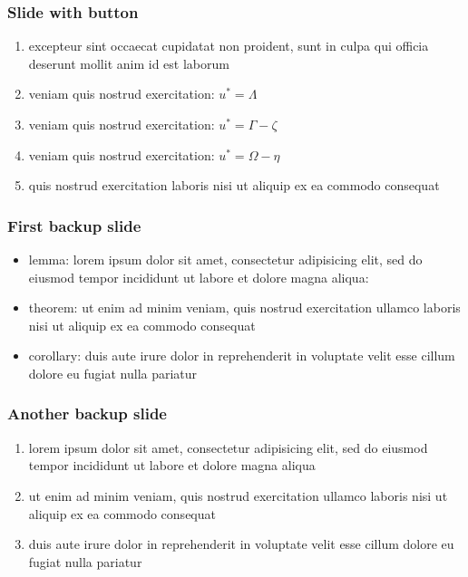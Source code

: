\documentclass[12pt,xcolor={dvipsnames},hyperref={pdftex,pdfpagemode=UseNone,hidelinks,pdfdisplaydoctitle=true},usepdftitle=false]{beamer}
\begin{document}
\begin{frame}[label=firstSlide]
\frametitle{Slide with button}
\begin{enumerate}
\item excepteur sint occaecat cupidatat non proident, sunt in culpa qui officia deserunt mollit anim id est laborum
\item veniam quis nostrud exercitation: $u^* = \Lambda$
\item veniam quis nostrud exercitation: $u^* = \Gamma - \zeta$
\item veniam quis nostrud exercitation:  $u^* = \Omega - \eta$
\item quis nostrud exercitation laboris nisi ut aliquip ex ea commodo consequat
\end{enumerate}
\hyperlink{backupSlide}{}
\hyperlink{anotherBackupSlide}{}
\end{frame}

\begin{frame}[label=backupSlide]
\frametitle{First backup slide}
\begin{itemize}
\item lemma: lorem ipsum dolor sit amet, consectetur adipisicing elit, sed do eiusmod
tempor incididunt ut labore et dolore magna aliqua:
\item theorem: ut enim ad minim veniam, quis nostrud exercitation ullamco laboris nisi ut aliquip ex ea commodo consequat
\item corollary: duis aute irure dolor in reprehenderit in voluptate velit esse
cillum dolore eu fugiat nulla pariatur
\end{itemize}
\hyperlink{firstSlide}{}
\end{frame}

\begin{frame}[label=anotherBackupSlide]
\frametitle{Another backup slide}
\begin{enumerate}
\item lorem ipsum dolor sit amet, consectetur adipisicing elit, sed do eiusmod
tempor incididunt ut labore et dolore magna aliqua
\item ut enim ad minim veniam, quis nostrud exercitation ullamco laboris nisi ut aliquip ex ea commodo consequat
\item duis aute irure dolor in reprehenderit in voluptate velit esse
cillum dolore eu fugiat nulla pariatur
\end{enumerate}
\hyperlink{firstSlide}{}
\end{frame}
\end{document}
